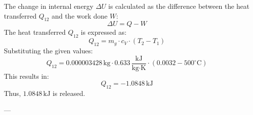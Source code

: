 The change in internal energy \( \Delta U \) is calculated as the difference between the heat transferred \( Q_{12} \) and the work done \( W \):  
\[
\Delta U = Q - W
\]  
The heat transferred \( Q_{12} \) is expressed as:  
\[
Q_{12} = m_g \cdot c_V \cdot (T_2 - T_1)
\]  
Substituting the given values:  
\[
Q_{12} = 0.000003428 \, \text{kg} \cdot 0.633 \, \frac{\text{kJ}}{\text{kg·K}} \cdot (0.0032 - 500^\circ\text{C})
\]  
This results in:  
\[
Q_{12} = -1.0848 \, \text{kJ}
\]  
Thus, \( 1.0848 \, \text{kJ} \) is released.

---